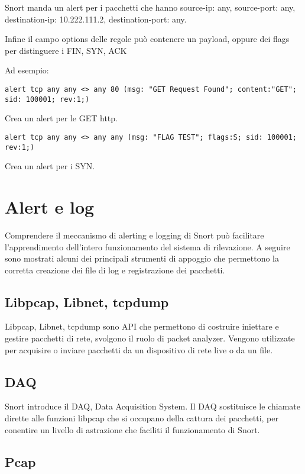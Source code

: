 Snort manda un alert per i pacchetti che hanno source-ip: any, source-port: any, destination-ip: 10.222.111.2, destination-port: any.

Infine il campo options delle regole può contenere un payload, oppure dei flags per distinguere i FIN, SYN, ACK

Ad esempio:

\begin{verbatim}
alert tcp any any <> any 80 (msg: "GET Request Found"; content:"GET";
sid: 100001; rev:1;)
\end{verbatim}

Crea un alert per le GET http.

\begin{verbatim}
alert tcp any any <> any any (msg: "FLAG TEST"; flags:S; sid: 100001; rev:1;)
\end{verbatim}

Crea un alert per i SYN.

\section{Alert e log}

Comprendere il meccanismo di alerting e logging di Snort può facilitare l'apprendimento dell'intero funzionamento del sistema di rilevazione. A seguire sono mostrati alcuni dei principali strumenti di appoggio che permettono la corretta creazione dei file di log e registrazione dei pacchetti.

\subsection{Libpcap, Libnet, tcpdump}

Libpcap, Libnet, tcpdump sono API che permettono di costruire iniettare e gestire pacchetti di rete, svolgono il ruolo di packet analyzer. Vengono utilizzate per acquisire o inviare pacchetti da un dispositivo di rete live o da un file.

\subsection{DAQ}

Snort introduce il DAQ, Data Acquisition System. Il DAQ sostituisce le chiamate dirette alle funzioni libpcap che si occupano della cattura dei pacchetti, per conentire un livello di astrazione che faciliti il funzionamento di Snort.

\subsection{Pcap}


